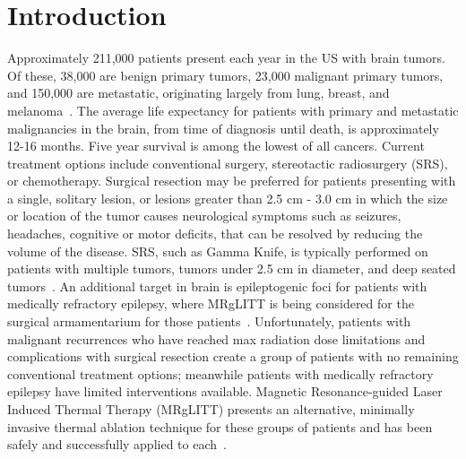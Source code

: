 \documentclass[12pt]{article}
\begin{document}
\section{Introduction}

Approximately 211,000 patients present each year in the US with brain
tumors.  Of these, 38,000 are benign primary tumors, 23,000 malignant
primary tumors, and 150,000 are metastatic, originating largely from lung,
breast, and melanoma~\cite{NCIFact13,
kalkanis2010evidence,gavrilovic2005brain,bafaloukos2004treatment,Owonikoko2014}.
The average life expectancy for patients with primary and metastatic
malignancies in the brain, from time of diagnosis until death, is
approximately 12-16 months. Five year survival is among the lowest of all
cancers. Current treatment options include conventional surgery,
stereotactic radiosurgery (SRS), or chemotherapy.  
Surgical resection may be preferred for patients presenting with a single,
solitary lesion, or lesions greater than 2.5 cm - 3.0 cm in which the size
or location of the tumor causes neurological symptoms such as seizures,
headaches, cognitive or motor deficits, that can be resolved by reducing
the volume of the disease.
SRS, such as Gamma Knife\textsuperscript{\textregistered}, is typically performed on patients with multiple
tumors, tumors under 2.5 cm in diameter, and deep seated tumors~\cite{alexander1995stereotactic}.
An additional target in brain is
epileptogenic foci for patients with medically refractory epilepsy,
where MRgLITT is being considered for the surgical armamentarium for those patients~\cite{curry2012mr,Nowell2014}.
Unfortunately, patients with malignant recurrences who have reached max radiation dose
limitations and complications with surgical resection create a group of
patients with no remaining conventional treatment options;
meanwhile patients with medically refractory epilepsy have limited interventions available.
Magnetic Resonance-guided Laser Induced Thermal Therapy (MRgLITT) presents
an alternative, minimally invasive thermal ablation technique for these
groups of patients and has been safely and successfully applied to 
each~\cite{carpentieretal08,carpentier2011laser,
carpentier2012mr,torres2013stereotactic,jethwa2012magnetic,
schwarzmaier2002basic,schulze2004laser}. 
\end{document}
